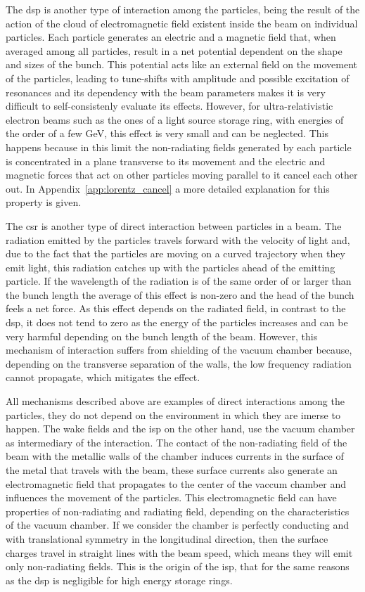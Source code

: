 \documentclass[
	12pt,				%
	openright,			%
	oneside,			%
	a4paper,		%
	chapter=TITLE,		%
	section=TITLE,		%
    brazil,				%
	english,			%
	sumario=tradicional,
	]{abntex2}
\begin{document}
  The \gls{dsp} is another type of interaction among the particles, being the result of the action of the cloud of electromagnetic field existent inside the beam on individual particles. Each particle generates an electric and a magnetic field that, when averaged among all particles, result in a net potential dependent on the shape and sizes of the bunch. This potential acts like an external field on the movement of the particles, leading to tune-shifts with amplitude and possible excitation of resonances and its dependency with the beam parameters makes it is very difficult to self-consistenly evaluate its effects. However, for ultra-relativistic electron beams such as the ones of a light source storage ring, with energies of the order of a few \si{\giga\electronvolt}, this effect is very small and can be neglected. This happens because in this limit the non-radiating fields generated by each particle is concentrated in a plane transverse to its movement and the electric and magnetic forces that act on other particles moving parallel to it cancel each other out. In Appendix~\ref{app:lorentz_cancel} a more detailed explanation for this property is given.

  The \gls{csr} is another type of direct interaction between particles in a beam. The radiation emitted by the particles travels forward with the velocity of light and, due to the fact that the particles are moving on a curved trajectory when they emit light, this radiation catches up with the particles ahead of the emitting particle. If the wavelength of the radiation is of the same order of or larger than the bunch length the average of this effect is non-zero and the head of the bunch feels a net force. As this effect depends on the radiated field, in contrast to the \gls{dsp}, it does not tend to zero as the energy of the particles increases and can be very harmful depending on the bunch length of the beam. However, this mechanism of interaction suffers from shielding of the vacuum chamber because, depending on the transverse separation of the walls, the low frequency radiation cannot propagate, which mitigates the effect.

  All mechanisms described above are examples of direct interactions among the particles, they do not depend on the environment in which they are imerse to happen. The wake fields and the \gls{isp} on the other hand, use the vacuum chamber as intermediary of the interaction. The contact of the non-radiating field of the beam with the metallic walls of the chamber induces currents in the surface of the metal that travels with the beam, these surface currents also generate an electromagnetic field that propagates to the center of the vaccum chamber and influences the movement of the particles. This electromagnetic field can have properties of non-radiating and radiating field, depending on the characteristics of the vacuum chamber. If we consider the chamber is perfectly conducting and with translational symmetry in the longitudinal direction, then the surface charges travel in straight lines with the beam speed, which means they will emit only non-radiating fields. This is the origin of the \gls{isp}, that for the same reasons as the \gls{dsp} is negligible for high energy storage rings.
\end{document}
